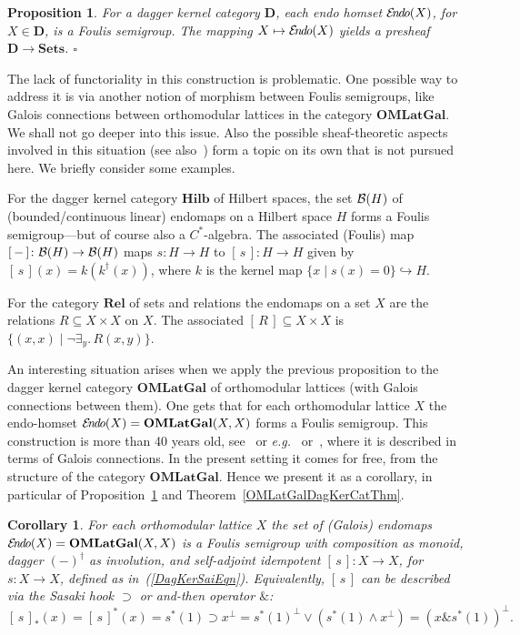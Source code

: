 \documentclass{article}
\newtheorem{proposition}[theorem]{Proposition}
\newtheorem{corollary}[theorem]{Corollary}
\newcommand{\QEDbox}{\square}
\newcommand{\QED}{\hspace*{\fill}$\QEDbox$}
\newcommand{\Cat}[1]{\ensuremath{\mathbf{#1}}}
\newcommand{\sasaki}{\mathrel{\supset}}
\newcommand{\andthen}{\mathrel{\&}}
\newcommand{\Rel}{\Cat{Rel}\xspace}
\newcommand{\Hilb}{\Cat{Hilb}\xspace}
\newcommand{\Sets}{\Cat{Sets}\xspace}
\newcommand{\set}[2]{\{#1\;|\;#2\}}
\newcommand{\conjun}{\mathrel{\wedge}}
\newcommand{\disjun}{\mathrel{\vee}}
\newcommand{\ex}[2]{\exists_{#1}.\,#2}
\newcommand{\sai}[1]{[\,#1\,]}
\newcommand{\EndoHom}[1]{{\cal E}{\kern-.5ex}\textit{n}{\kern-.2ex}\textit{d}{\kern-.2ex}\textit{o}(#1)}
\begin{document}
\begin{proposition}
\label{DagKer2FoulisProp}
For a dagger kernel category \Cat{D}, each endo homset $\EndoHom{X}$,
for $X\in\Cat{D}$, is a Foulis semigroup. The mapping $X\mapsto
\EndoHom{X}$ yields a presheaf $\Cat{D} \rightarrow \Sets$. \QED
\end{proposition}




The lack of functoriality in this construction is problematic. One
possible way to address it is via another notion of morphism between
Foulis semigroups, like Galois connections between orthomodular
lattices in the category \Cat{OMLatGal}. We shall not go deeper into
this issue. Also the possible sheaf-theoretic aspects involved in this
situation (see also~\cite{GravesS73}) form a topic on its own that is
not pursued here.  We briefly consider some examples.

For the dagger kernel category \Hilb of Hilbert spaces, the set ${\cal
  B}(H)$ of (bounded/continuous linear) endomaps on a Hilbert space
$H$ forms a Foulis semigroup---but of course also a $C^*$-algebra. The
associated (Foulis) map $\sai{-}\colon {\cal B}(H)\rightarrow
{\cal B}(H)$ maps $s\colon H\rightarrow H$ to $\sai{s}\colon H\rightarrow
H$ given by $\sai{s}(x) = k(k^{\dag}(x))$, where $k$ is the kernel map
$\set{x}{s(x)=0} \hookrightarrow H$.



For the category \Rel of sets and relations the endomaps on a set $X$
are the relations $R\subseteq X\times X$ on $X$. The associated
$\sai{R} \subseteq X\times X$ is $\set{(x,x)}{\neg\ex{y}{R(x,y)}}$.

An interesting situation arises when we apply the previous proposition
to the dagger kernel category \Cat{OMLatGal} of orthomodular lattices
(with Galois connections between them). One gets that for each
orthomodular lattice $X$ the endo-homset $\EndoHom{X} =
\Cat{OMLatGal}(X, X)$ forms a Foulis semigroup. This construction is
more than 40 years old, see~\cite{Foulis60} or
\textit{e.g.}~\cite[Chapter~II, Section~19]{BlythJ72}
or~\cite[Chapter~5, \S\S18]{Kalmbach83}, where it is described in
terms of Galois connections.  In the present setting it comes for
free, from the structure of the category \Cat{OMLatGal}. Hence we
present it as a corollary, in particular of
Proposition~\ref{DagKer2FoulisProp} and
Theorem~\ref{OMLatGalDagKerCatThm}.


\begin{corollary}
\label{OMLat2FoulisCor}
For each orthomodular lattice $X$ the set of (Galois) endomaps
$\EndoHom{X} = \Cat{OMLatGal}(X,X)$ is a Foulis semigroup with
composition as monoid, dagger $(-)^{\dag}$ as involution, and
self-adjoint idempotent $\sai{s}\colon X\rightarrow X$, for $s\colon
X\rightarrow X$, defined as in~(\ref{DagKerSaiEqn}). Equivalently,
$\sai{s}$ can be described via the Sasaki hook $\sasaki$ or and-then
operator $\andthen$:
$$\sai{s}_{*}(x) 
= 
\sai{s}^{*}(x) 
=
s^{*}(1) \sasaki x^{\perp}
=
s^{*}(1)^{\perp} \disjun (s^{*}(1) \conjun x^{\perp})
=
(x\andthen s^{*}(1))^{\perp}.$$
\end{corollary}
\end{document}
